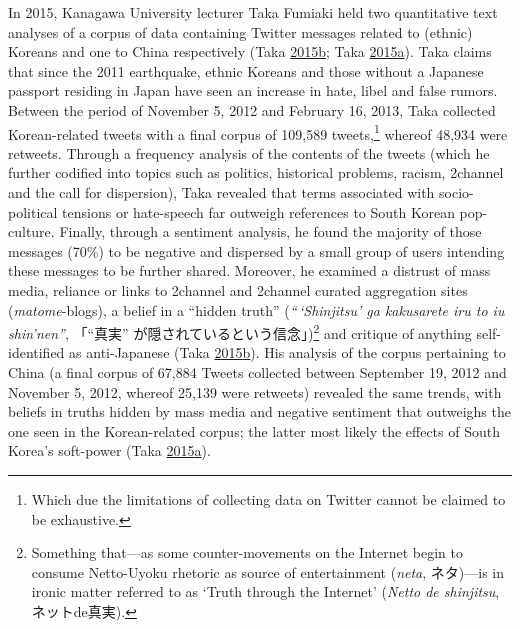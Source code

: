 \documentclass[10pt,british,A4paper,oneside]{memoir}
\begin{document}
In 2015, Kanagawa University lecturer Taka Fumiaki held two quantitative
text analyses of a corpus of data containing Twitter messages related to
(ethnic) Koreans and one to China respectively (Taka
\protect\hyperlink{ref-taka_twitter_2015-1}{2015}\protect\hyperlink{ref-taka_twitter_2015-1}{b};
Taka
\protect\hyperlink{ref-taka_twitter_2015}{2015}\protect\hyperlink{ref-taka_twitter_2015}{a}).
Taka claims that since the 2011 earthquake, ethnic Koreans and those
without a Japanese passport residing in Japan have seen an increase in
hate, libel and false rumors. Between the period of November 5, 2012 and
February 16, 2013, Taka collected Korean-related tweets with a final
corpus of 109,589 tweets,\footnote{Which due the limitations of
  collecting data on Twitter cannot be claimed to be exhaustive.}
whereof 48,934 were retweets. Through a frequency analysis of the
contents of the tweets (which he further codified into topics such as
politics, historical problems, racism, 2channel and the call for
dispersion), Taka revealed that terms associated with socio-political
tensions or hate-speech far outweigh references to South Korean
pop-culture. Finally, through a sentiment analysis, he found the
majority of those messages (70\%) to be negative and dispersed by a
small group of users intending these messages to be further shared.
Moreover, he examined a distrust of mass media, reliance or links to
2channel and 2channel curated aggregation sites (\emph{matome}-blogs), a
belief in a ``hidden truth'' (\emph{``\,`Shinjitsu' ga kakusarete iru to
iu shin'nen''}, 「``真実'' が隠されているという信念」)\footnote{Something
  that---as some counter-movements on the Internet begin to consume
  Netto-Uyoku rhetoric as source of entertainment (\emph{neta},
  ネタ)---is in ironic matter referred to as `Truth through the
  Internet' (\emph{Netto de shinjitsu}, ネットde真実).} and critique of
anything self-identified as anti-Japanese (Taka
\protect\hyperlink{ref-taka_twitter_2015-1}{2015}\protect\hyperlink{ref-taka_twitter_2015-1}{b}).
His analysis of the corpus pertaining to China (a final corpus of 67,884
Tweets collected between September 19, 2012 and November 5, 2012,
whereof 25,139 were retweets) revealed the same trends, with beliefs in
truths hidden by mass media and negative sentiment that outweighs the
one seen in the Korean-related corpus; the latter most likely the
effects of South Korea's soft-power (Taka
\protect\hyperlink{ref-taka_twitter_2015}{2015}\protect\hyperlink{ref-taka_twitter_2015}{a}).
\end{document}
